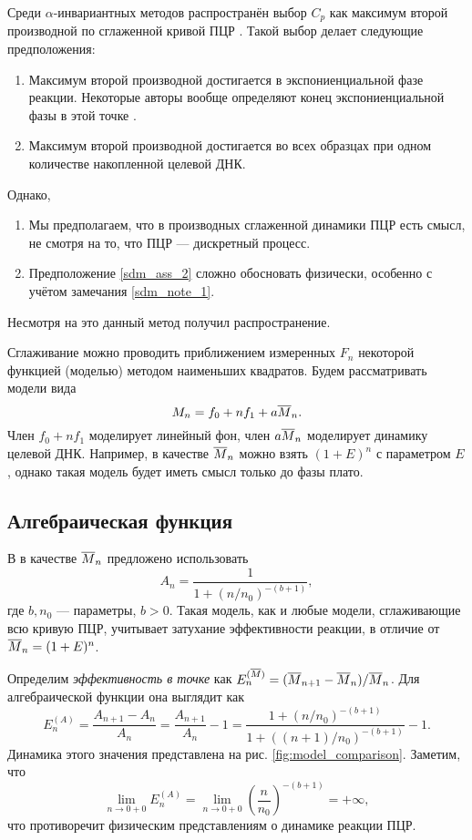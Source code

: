 Среди $\alpha$-инвариантных методов распространён выбор $C_{p}$ как максимум
второй производной по сглаженной кривой ПЦР
\cite{rasmussenQuantificationLightCycler2001}. Такой выбор делает следующие
предположения:
\begin{enumerate}[label=(\alph*)]
  \item{}Максимум второй производной достигается в экспониенциальной фазе
  реакции. Некоторые авторы вообще определяют конец экспониенциальной фазы
  в этой точке \cite{tichopadStandardizedDeterminationRealtime2003,
    zhaoComprehensiveAlgorithmQuantitative2005}.
  \item{}Максимум второй производной достигается во всех образцах при одном
  количестве накопленной целевой ДНК.\label{sdm_ass_2}
\end{enumerate}
Однако,
\begin{enumerate}[label=(\roman*)]
  \item{}Мы предполагаем, что в производных сглаженной динамики ПЦР есть
  смысл, не смотря на то, что ПЦР --- дискретный процесс.\label{sdm_note_1}
  \item{}Предположение \ref{sdm_ass_2} сложно обосновать физически, особенно с
  учётом замечания \ref{sdm_note_1}.\label{sdm_note_2}
\end{enumerate}
Несмотря на это данный метод получил распространение.

Сглаживание можно проводить приближением измеренных $F_{n}$ некоторой функцией
(моделью) методом наименьших квадратов. Будем рассматривать модели вида
\[
  M_{n}=f_0+nf_1+a\overline{M}_{n}.
\]
Член $f_0+nf_1$ моделирует линейный фон, член $a\overline{M}_{n}$ моделирует
динамику целевой ДНК. Например, в качестве $\overline{M}_{n}$ можно взять
$(1+E)^{n}$ с параметром $E$, однако такая модель будет иметь смысл только до
фазы плато.

\subsection{Алгебраическая функция}

В
\cite{tichopadStandardizedDeterminationRealtime2003,zhaoComprehensiveAlgorithmQuantitative2005}
в качестве $\overline{M}_{n}$ предложено использовать
\[
  A_{n}=\frac{1}{1+(n/n_0)^{-(b+1)}},
\]
где $b,n_0$ --- параметры, $b>0$. Такая модель, как и любые модели,
сглаживающие всю кривую ПЦР, учитывает затухание эффективности реакции, в
отличие от $\overline{M}_{n}=(1+E)^{n}$.

Определим {\it эффективность в точке} как
$E^{(\overline{M})}_{n}=(\overline{M}_{n+1}-\overline{M}_{n})/\overline{M}_{n}$. Для алгебраической
функции она выглядит как
\[
  E^{(A)}_{n}=\frac{A_{n+1}-A_{n}}{A_{n}}=\frac{A_{n+1}}{A_{n}}-1=
  \frac{1+(n/n_0)^{-(b+1)}}{1+((n+1)/n_0)^{-(b+1)}}-1.
\]
Динамика этого значения представлена на рис. \ref{fig:model_comparison}.
Заметим, что
\[
  \lim_{n\to 0+0}E^{(A)}_{n}=
  \lim_{n\to 0+0}\left(\frac{n}{n_0}\right)^{-(b+1)}=+\infty,
\]
что противоречит физическим представлениям о динамике реакции ПЦР.

